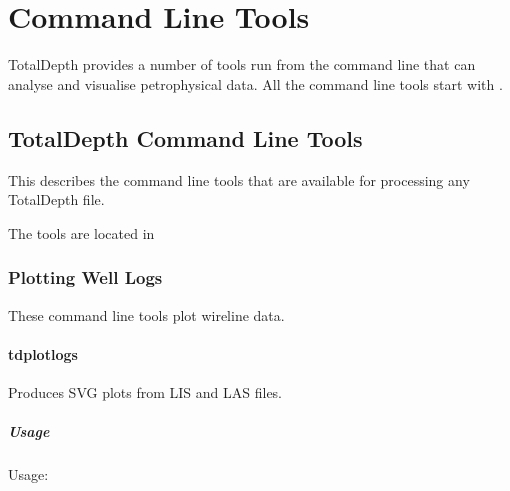 \documentclass[letterpaper,10pt,english]{sphinxmanual}
\begin{document}
\section{Command Line Tools}
\label{\detokenize{cmd_line_tools/index_cmd_line_tools::doc}}\label{\detokenize{cmd_line_tools/index_cmd_line_tools:command-line-tools}}
TotalDepth provides a number of tools run from the command line that can analyse and visualise petrophysical data.
All the command line tools start with .


\subsection{TotalDepth Command Line Tools}
\label{\detokenize{cmd_line_tools/TD_cmd_line_tools:totaldepth-command-line-tools}}\label{\detokenize{cmd_line_tools/TD_cmd_line_tools::doc}}
This describes the command line tools that are available for processing any TotalDepth file.

The tools are located in 


\subsubsection{Plotting Well Logs}
\label{\detokenize{cmd_line_tools/TD_cmd_line_tools:plotting-well-logs}}
These command line tools plot wireline data.


\paragraph{tdplotlogs}
\label{\detokenize{cmd_line_tools/TD_cmd_line_tools:tdplotlogs}}\label{\detokenize{cmd_line_tools/TD_cmd_line_tools:totaldepth-cmdline-plotlogs}}
Produces SVG plots from LIS and LAS files.


\subparagraph{Usage}
\label{\detokenize{cmd_line_tools/TD_cmd_line_tools:usage}}
Usage:

\begin{sphinxVerbatim}[commandchars=\\\{\}]
  \PYG{p}{[}\PYG{p}{]} \PYG{p}{[}\PYG{p}{]} \PYG{p}{[} \PYG{p}{]} \PYG{p}{[}\PYG{p}{]} \PYG{p}{[} \PYG{p}{]} \PYG{p}{[}\PYG{p}{]} \PYG{p}{[}\PYG{p}{]}
                   \PYG{p}{[}\PYG{p}{]} \PYG{p}{[} \PYG{p}{]} \PYG{p}{[} \PYG{p}{]} \PYG{p}{[} \PYG{p}{]}
                    
\end{sphinxVerbatim}
\end{document}
